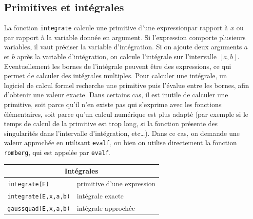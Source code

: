 \documentclass{article}
\begin{document}
\begin{giacjshere}
\subsection{Primitives et int\'egrales}
%
La fonction \verb|integrate| calcule une primitive d'une expressionpar rapport \`a 
$x$ ou par rapport \`a la variable donn\'ee en argument. Si
l'expression comporte plusieurs variables, il vaut pr\'eciser la
variable d'int\'egration. Si on ajoute deux arguments $a$ et $b$ 
apr\`es la variable d'int\'egration, on calcule l'int\'egrale sur
l'intervalle $[a,b]$. Eventuellement les
bornes de l'int\'egrale peuvent \^etre des expressions, ce qui permet
de calculer des int\'egrales multiples.
Pour calculer une int\'egrale, un logiciel de calcul formel recherche 
une primitive puis l'\'evalue entre les bornes, afin d'obtenir
une valeur exacte. Dans certains cas, il est inutile de calculer
une primitive, soit parce qu'il n'en existe pas qui s'exprime
avec les fonctions \'el\'ementaires, soit 
parce qu'un calcul num\'erique est plus adapt\'e (par exemple si 
le temps de calcul de la primitive est trop long, si la fonction
pr\'esente des singularit\'es dans l'intervalle d'int\'egration, etc\ldots).
Dans ce cas, on demande une valeur approch\'ee en utilisant
\verb|evalf|, ou bien on utilise directement 
la fonction \verb|romberg|, qui est
appel\'ee par \verb|evalf|.

\begin{center}
\begin{tabular}{|ll|}
\hline
\multicolumn{2}{|c|}{\bf Int\'egrales}\\
\hline\hline
\verb|integrate(E)| &primitive d'une expression\\
\verb|integrate(E,x,a,b)| & int\'egrale exacte\\
\verb|gaussquad(E,x,a,b)| & int\'egrale approch\'ee\\
\hline
\end{tabular}
\end{center}
%

\end{giacjshere}
\end{document}
